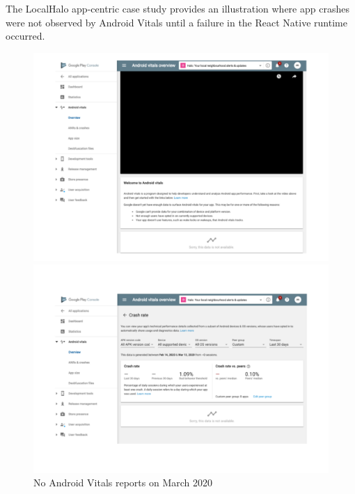 The LocalHalo app-centric case study provides an illustration where app crashes were not observed by Android Vitals until a failure in the React Native runtime occurred.

\begin{figure}[htbp!]
\RawFloats
\centering
\begin{minipage}{.45\linewidth}
  \centering
  \includegraphics[width=\linewidth]{images/localhalo/apphealthoverviewplace_5550596_no_data.pdf}
\end{minipage}\hfill%
\begin{minipage}{.45\linewidth}
  \centering
  \includegraphics[width=\linewidth]{images/localhalo/apphealthdetailsplace_55505963_no_data.pdf}
\end{minipage}
    \caption{No Android Vitals reports on  March 2020}
    \label{fig:localhalo-android-vitals-no-data-16-march-2020}
\end{figure}


